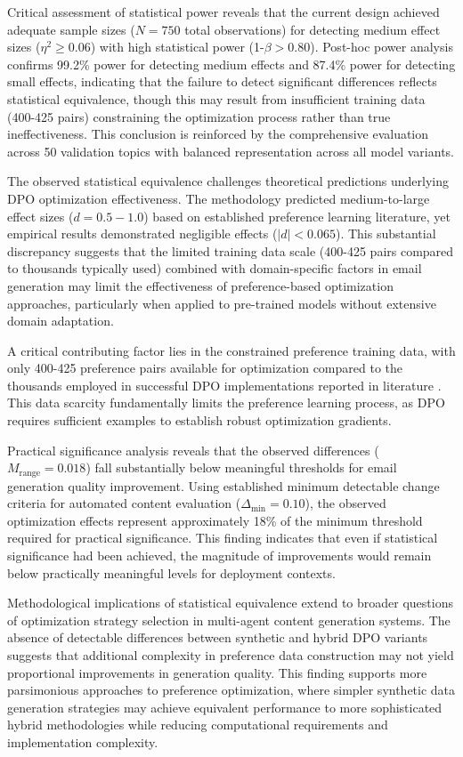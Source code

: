 Critical assessment of statistical power reveals that the current design achieved adequate sample sizes ($N = 750$ total observations) for detecting medium effect sizes ($\eta^2 \geq 0.06$) with high statistical power (1-$\beta > 0.80$). Post-hoc power analysis confirms 99.2\% power for detecting medium effects and 87.4\% power for detecting small effects, indicating that the failure to detect significant differences reflects statistical equivalence, though this may result from insufficient training data (400-425 pairs) constraining the optimization process rather than true ineffectiveness. This conclusion is reinforced by the comprehensive evaluation across 50 validation topics with balanced representation across all model variants.

The observed statistical equivalence challenges theoretical predictions underlying DPO optimization effectiveness. The methodology predicted medium-to-large effect sizes ($d = 0.5-1.0$) based on established preference learning literature, yet empirical results demonstrated negligible effects ($|d| < 0.065$). This substantial discrepancy suggests that the limited training data scale (400-425 pairs compared to thousands typically used) combined with domain-specific factors in email generation may limit the effectiveness of preference-based optimization approaches, particularly when applied to pre-trained models without extensive domain adaptation.

A critical contributing factor lies in the constrained preference training data, with only 400-425 preference pairs available for optimization compared to the thousands employed in successful DPO implementations reported in literature \cite{cui2023ultrafeedback}. This data scarcity fundamentally limits the preference learning process, as DPO requires sufficient examples to establish robust optimization gradients.

Practical significance analysis reveals that the observed differences ($M_{\text{range}} = 0.018$) fall substantially below meaningful thresholds for email generation quality improvement. Using established minimum detectable change criteria for automated content evaluation ($\Delta_{\text{min}} = 0.10$), the observed optimization effects represent approximately 18\% of the minimum threshold required for practical significance. This finding indicates that even if statistical significance had been achieved, the magnitude of improvements would remain below practically meaningful levels for deployment contexts.

Methodological implications of statistical equivalence extend to broader questions of optimization strategy selection in multi-agent content generation systems. The absence of detectable differences between synthetic and hybrid DPO variants suggests that additional complexity in preference data construction may not yield proportional improvements in generation quality. This finding supports more parsimonious approaches to preference optimization, where simpler synthetic data generation strategies may achieve equivalent performance to more sophisticated hybrid methodologies while reducing computational requirements and implementation complexity.

